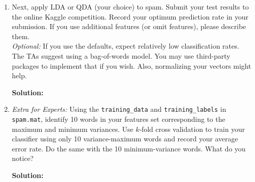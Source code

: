 \documentclass{article}
\newcommand{\solution}{\textbf{Solution: }}
\begin{document}
\begin{enumerate}[label=(\alph*)]
\begin{enumerate}[label=(\roman*)]
        \item  (Written answer.) Which of LDA and QDA performed better? Why?
        \begin{mdframed} \solution
        \end{mdframed}

        \item Train your best classifier with \texttt{train.mat} and classify the images in \texttt{test.mat}. Submit your labels to the online Kaggle competition. Record your optimum prediction rate in your submission. You are welcome to compute extra features for the Kaggle competition. If you do so, please describe your implementation in your assignment. Please use extra features \textbf{only} for this portion of the assignment. In your submission, include plots of error rate versus number of training examples for both LDA and QDA. Also include tables giving the error rates (as percentages) for each number of training examples for both LDA and QDA. Include written answers where indicated.
        \begin{mdframed} \solution
        \end{mdframed}

    \end{enumerate}
    \item Next, apply LDA or QDA (your choice) to spam. Submit your test results to the online Kaggle competition. Record your optimum prediction rate in your submission. If you use additional features (or omit features), please describe them. \\

    \emph{Optional:} If you use the defaults, expect relatively low classification rates. The TAs suggest using a bag-of-words model. You may use third-party packages to implement that if you wish. Also, normalizing your vectors might help.

    \begin{mdframed} \solution
    \end{mdframed}

    \item \emph{Extra for Experts:} Using the \texttt{training\_data} and \texttt{training\_labels} in \texttt{spam.mat}, identify 10 words in your features set corresponding to the maximum and minimum variances. Use $k$-fold cross validation to train your classifier using only 10 variance-maximum words and record your average error rate. Do the same with the 10 minimum-variance words. What do you notice?
    \begin{mdframed} \solution
    \end{mdframed}
\end{enumerate}
\end{document}
